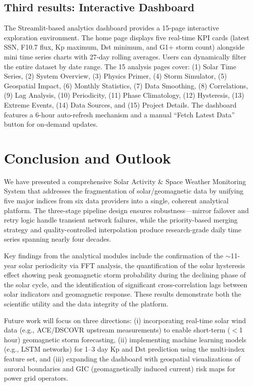 \subsection{Third results: Interactive Dashboard}

The Streamlit-based analytics dashboard provides a 15-page interactive exploration environment. The home page displays five real-time KPI cards (latest SSN, F10.7 flux, Kp maximum, Dst minimum, and G1+ storm count) alongside mini time series charts with 27-day rolling averages. Users can dynamically filter the entire dataset by date range. The 15 analysis pages cover: (1) Solar Time Series, (2) System Overview, (3) Physics Primer, (4) Storm Simulator, (5) Geospatial Impact, (6) Monthly Statistics, (7) Data Smoothing, (8) Correlations, (9) Lag Analysis, (10) Periodicity, (11) Phase Climatology, (12) Hysteresis, (13) Extreme Events, (14) Data Sources, and (15) Project Details. The dashboard features a 6-hour auto-refresh mechanism and a manual ``Fetch Latest Data'' button for on-demand updates.


\section{Conclusion and Outlook}

We have presented a comprehensive Solar Activity \& Space Weather Monitoring System that addresses the fragmentation of solar/geomagnetic data by unifying five major indices from six data providers into a single, coherent analytical platform. The three-stage pipeline design ensures robustness---mirror failover and retry logic handle transient network failures, while the priority-based merging strategy and quality-controlled interpolation produce research-grade daily time series spanning nearly four decades.

Key findings from the analytical modules include the confirmation of the $\sim$11-year solar periodicity via FFT analysis, the quantification of the solar hysteresis effect showing peak geomagnetic storm probability during the declining phase of the solar cycle, and the identification of significant cross-correlation lags between solar indicators and geomagnetic response. These results demonstrate both the scientific utility and the data integrity of the platform.

Future work will focus on three directions: (i) incorporating real-time solar wind data (e.g., ACE/DSCOVR upstream measurements) to enable short-term ($<$1 hour) geomagnetic storm forecasting, (ii) implementing machine learning models (e.g., LSTM networks) for 1--3 day Kp and Dst prediction using the multi-index feature set, and (iii) expanding the dashboard with geospatial visualizations of auroral boundaries and GIC (geomagnetically induced current) risk maps for power grid operators.


